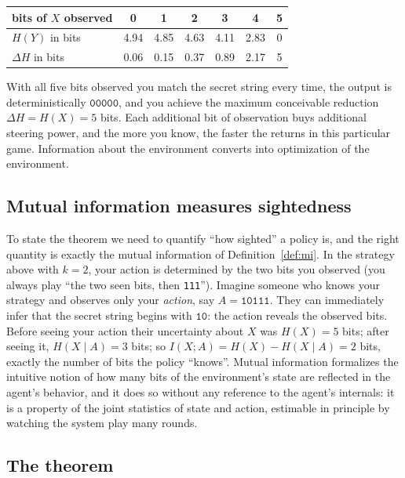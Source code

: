 \documentclass[10pt]{article}
\theoremstyle{definition}
\theoremstyle{remark}
\begin{document}
\begin{center}
\begin{tabular}{lcccccc}
\toprule
bits of $X$ observed & 0 & 1 & 2 & 3 & 4 & 5 \\
\midrule
$H(Y)$ in bits & 4.94 & 4.85 & 4.63 & 4.11 & 2.83 & 0 \\
$\Delta H$ in bits & 0.06 & 0.15 & 0.37 & 0.89 & 2.17 & 5 \\
\bottomrule
\end{tabular}
\end{center}

With all five bits observed you match the secret string every time, the output is deterministically $\texttt{00000}$, and you achieve the maximum conceivable reduction $\Delta H = H(X) = 5$ bits. Each additional bit of observation buys additional steering power, and the more you know, the faster the returns in this particular game. Information about the environment converts into optimization of the environment.

\subsection{Mutual information measures sightedness}
\label{sec:misighted}

To state the theorem we need to quantify ``how sighted'' a policy is, and the right quantity is exactly the mutual information of Definition~\ref{def:mi}. In the strategy above with $k = 2$, your action is determined by the two bits you observed (you always play ``the two seen bits, then \texttt{111}''). Imagine someone who knows your strategy and observes only your \emph{action}, say $A = \texttt{10111}$. They can immediately infer that the secret string begins with $\texttt{10}$: the action reveals the observed bits. Before seeing your action their uncertainty about $X$ was $H(X) = 5$ bits; after seeing it, $H(X \mid A) = 3$ bits; so $I(X; A) = H(X) - H(X \mid A) = 2$ bits, exactly the number of bits the policy ``knows''. Mutual information formalizes the intuitive notion of how many bits of the environment's state are reflected in the agent's behavior, and it does so without any reference to the agent's internals: it is a property of the joint statistics of state and action, estimable in principle by watching the system play many rounds.

\subsection{The theorem}
\label{sec:tlthm}
\end{document}
